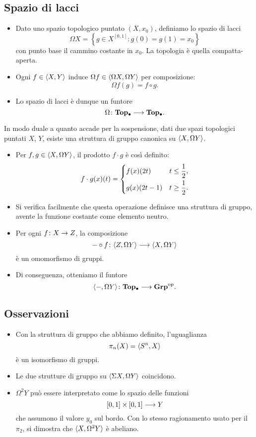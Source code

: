 \subsection*{Spazio di lacci}
\begin{frame*}
\begin{itemize}
\item Dato uno spazio topologico puntato $(X,x_0)$, definiamo lo spazio di lacci
\[
\Omega X=\left\{g\in X^{[0,1]}:g(0)=g(1)=x_0\right\}
\]
con punto base il cammino costante in $x_0$. La topologia è quella compatta-aperta.
\item Ogni $f\in\langle X,Y\rangle$ induce $\Omega f\in\langle \Omega X,\Omega Y\rangle$ per composizione:
\[
\Omega f(g)=f\circ g.
\]
 \item Lo spazio di lacci è dunque un funtore
\[
\map{\Omega}{\Top0}{\Top0}.
\]
\end{itemize}
\end{frame*}

\begin{frame*}
In modo duale a quanto accade per la sospensione, dati due spazi topologici puntati $X$, $Y$, esiste una struttura di gruppo canonica su $\langle X,\Omega Y\rangle$.
\begin{itemize}
\item Per $f,g\in\langle X,\Omega Y\rangle$, il prodotto $f\cdot g$ è così definito:
\[
f\cdot g(x)(t)=\begin{dcases}f(x)(2t)&t\le\frac{1}{2},\\g(x)(2t-1)&t\ge\frac{1}{2}.\end{dcases}
\]
\item Si verifica facilmente che questa operazione definisce una struttura di gruppo, avente la funzione costante come elemento neutro.
\item Per ogni $\map{f}{X}{Z}$, la composizione
\[
\map{-\circ f}{\hmaps{Z,\Omega Y}}{\hmaps{X,\Omega Y}}
\]
 è un omomorfismo di gruppi.
 \item Di conseguenza, otteniamo il funtore
 \[
 \map{\hmaps{-,\Omega Y}}{\Top0}{\Grp^{\text{op}}}.
 \]
\end{itemize}
\end{frame*}

\subsection*{Osservazioni}
\begin{frame*}
\begin{itemize}
\item Con la struttura di gruppo che abbiamo definito, l'uguaglianza
\[
\pi_n(X)=\langle S^n,X\rangle
\]
è un isomorfismo di gruppi.
\item Le due strutture di gruppo su  $\langle \Sigma X,\Omega Y\rangle$ coincidono.
\item $\Omega^2Y$ può essere interpretato come lo spazio delle funzioni
\[
\umap{[0,1]\times[0,1]}{Y}
\]
che assumono il valore $y_0$ sul bordo. Con lo stesso ragionamento usato per il $\pi_2$, si dimostra che $\langle X,\Omega^2Y\rangle$ è abeliano.
\end{itemize}
\end{frame*}

